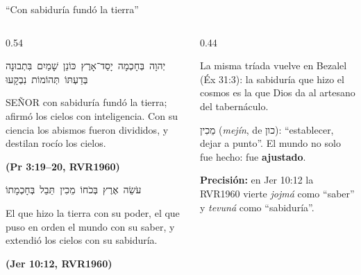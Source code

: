 \documentclass[hyperref={bookmarks=false},aspectratio=169]{beamer}
\newcommand{\heb}[1]{\mbox{\foreignlanguage{hebrew}{#1}}}
\newcommand{\SENOR}{S{\fontsize{0.78em}{1em}\selectfont EÑOR}}
\newcommand{\fuente}[1]{\par\hfill{\upshape\bfseries\footnotesize\textcolor{azul}{#1}}}
\newcommand{\destacar}[1]{\textbf{\textcolor{azul}{#1}}}
\newcommand{\precision}[1]{{\footnotesize\color{gris}\textbf{Precisión:} #1}}
\begin{document}
\begin{frame}{``Con sabiduría fundó la tierra''}
\begin{columns}[t,onlytextwidth]
\begin{column}{0.54\textwidth}
\begin{center}\small\heb{יְהוָה בְּחָכְמָה יָסַד־אָרֶץ כּוֹנֵן שָׁמַיִם בִּתְבוּנָה}\\[1pt]\heb{בְּדַעְתּוֹ תְּהוֹמוֹת נִבְקָעוּ}\end{center}
\begin{cita}[fontupper=\scriptsize\itshape]\SENOR{} con sabiduría fundó la tierra; afirmó los cielos con inteligencia. Con su ciencia los abismos fueron divididos, y destilan rocío los cielos.\fuente{(Pr 3:19--20, RVR1960)}\end{cita}
\begin{center}\small\heb{עֹשֵׂה אֶרֶץ בְּכֹחוֹ מֵכִין תֵּבֵל בְּחָכְמָתוֹ}\end{center}
\begin{cita}[fontupper=\scriptsize\itshape]El que hizo la tierra con su poder, el que puso en orden el mundo con su saber, y extendió los cielos con su sabiduría.\fuente{(Jer 10:12, RVR1960)}\end{cita}
\end{column}
\begin{column}{0.44\textwidth}
\centering
{}\par\smallskip
\scriptsize\RaggedRight La misma tríada vuelve en Bezalel (Éx 31:3): la sabiduría que hizo el cosmos es la que Dios da al artesano del tabernáculo.\par\smallskip
\heb{מֵכִין} (\emph{mejín}, de \heb{כון}): ``establecer, dejar a punto''. El mundo no solo fue hecho: fue \destacar{ajustado}.\par\smallskip
\precision{en Jer 10:12 la RVR1960 vierte \emph{jojmá} como ``saber'' y \emph{tevuná} como ``sabiduría''.}
\end{column}
\end{columns}
\end{frame}
\end{document}
